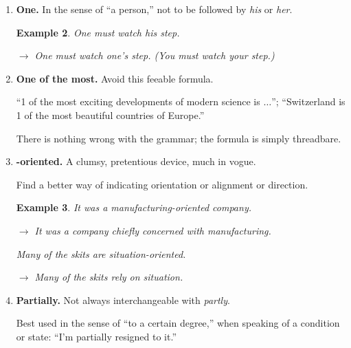 \documentclass{article}
\newtheorem{example}{Example}
\begin{document}
\begin{enumerate}
	{\it Ongoing} is a mix of ``continuing'' and ``active'' and is usually superfluous.
	\begin{example}
		He devoted all his spare time to the ongoing program for aid to the elderly.
		
		$\to$ He devoted all his spare time to the program for aid to the elderly.
	\end{example}
	{\it Offputting} might mean ``objectionable,'' ``disconcerting,'' ``distasteful.''
	
	Select instead a word whose meaning is clear.
	
	As a simple test, transform the participles to verbs.
	
	It is possible to {\it upset} something.
	
	But to {\it offput}?
	
	To {\it ongo}?
	\item {\bf One.} In the sense of ``a person,'' not to be followed by {\it his} or {\it her}.
	\begin{example}
		One must watch his step.
		
		$\to$ One must watch one's step. (You must watch your step.)
	\end{example}
	\item {\bf One of the most.} Avoid this feeable formula.
	
	``1 of the most exciting developments of modern science is $\ldots$''; ``Switzerland is 1 of the most beautiful countries of Europe.''
	
	There is nothing wrong with the grammar; the formula is simply threadbare.
	\item {\bf -oriented.} A clumsy, pretentious device, much in vogue.
	
	Find a better way of indicating orientation or alignment or direction.
	\begin{example}
		It was a manufacturing-oriented company.
		
		$\to$ It was a company chiefly concerned with manufacturing.
		
		Many of the skits are situation-oriented.
		
		$\to$ Many of the skits rely on situation.
	\end{example}
	\item {\bf Partially.} Not always interchangeable with {\it partly}.
	
	Best used in the sense of ``to a certain degree,'' when speaking of a condition or state: ``I'm partially resigned to it.''
	

\end{enumerate}
\end{document}
